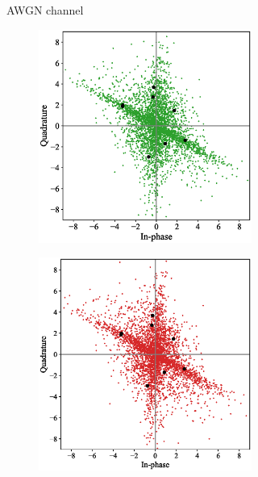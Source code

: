 \begin{figure}[tp!]
\begin{subfigure}{0.325\linewidth}
\begin{subfigure}{0.48\textwidth}
		\end{subfigure}
		\caption{AWGN channel}
		\label{fig:awgn_constellation}
	\end{subfigure}
	\begin{subfigure}{0.325\linewidth}
		\begin{subfigure}{0.48\textwidth}
			\includegraphics[width=\linewidth]{figs/rayleigh_normal_constellation}
		\end{subfigure}
		\hfill
		\begin{subfigure}{0.48\textwidth}
			\includegraphics[width=\linewidth]{figs/rayleigh_covert_constellation}

\end{subfigure}
\end{subfigure}
\end{figure}
